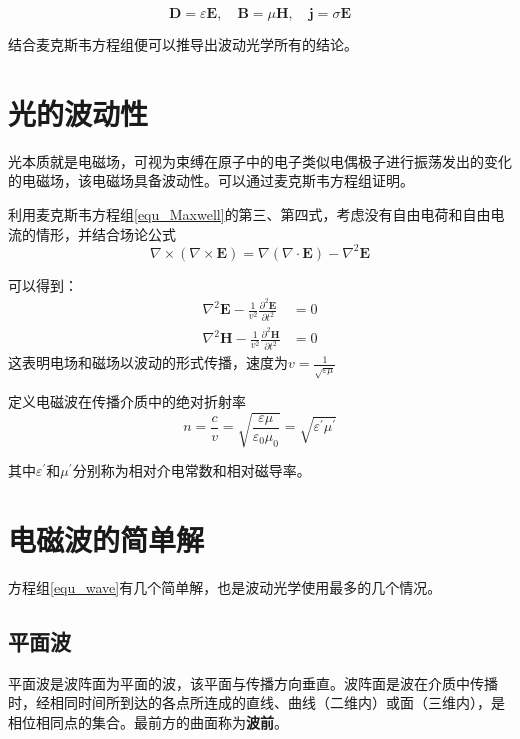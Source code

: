 \documentclass[UTF8]{ctexart}
\begin{document}
	\begin{equation}
		\boldsymbol{D}=\varepsilon \boldsymbol{E}, \quad \boldsymbol{B}=\mu \boldsymbol{H}, \quad \boldsymbol{j}=\sigma \boldsymbol{E}
	\end{equation}
	
	结合麦克斯韦方程组便可以推导出波动光学所有的结论。
	
	\section{光的波动性}
	光本质就是电磁场，可视为束缚在原子中的电子类似电偶极子进行振荡发出的变化的电磁场，该电磁场具备波动性。可以通过麦克斯韦方程组证明。
	
	利用麦克斯韦方程组\ref{equ_Maxwell}的第三、第四式，考虑没有自由电荷和自由电流的情形，并结合场论公式
	\begin{equation}
		\nabla \times(\nabla \times \boldsymbol{E})=\nabla(\nabla \cdot \boldsymbol{E})-\nabla^{2} \boldsymbol{E}
	\end{equation}
	
\noindent 可以得到：
\begin{equation}
	\begin{aligned}
	\nabla^{2} \boldsymbol{E}-\frac{1}{v^{2}}\frac{\partial^{2} \boldsymbol{E}}{\partial t^{2}}&=0
	\\
	\nabla^{2} \boldsymbol{H}-\frac{1}{v^{2}}\frac{\partial^{2} \boldsymbol{H}}{\partial t^{2}}&=0
	\end{aligned}\label{equ_wave}
\end{equation}
	这表明电场和磁场以波动的形式传播，速度为$ v=\frac{1}{\sqrt{\varepsilon \mu}} $
	
	定义电磁波在传播介质中的绝对折射率
	\begin{equation}
		n=\frac{c}{v}=\sqrt{\frac{\varepsilon \mu}{\varepsilon_{0} \mu_{0}}}=\sqrt{\varepsilon^{\prime} \mu^{\prime}}
	\end{equation}
	
\noindent 其中$ \varepsilon^{\prime} $和$ \mu^{\prime} $分别称为相对介电常数和相对磁导率。

	\section{电磁波的简单解}
	方程组\ref{equ_wave}有几个简单解，也是波动光学使用最多的几个情况。
	
	\subsection{平面波}
	平面波是波阵面为平面的波，该平面与传播方向垂直。波阵面是波在介质中传播时，经相同时间所到达的各点所连成的直线、曲线（二维内）或面（三维内），是相位相同点的集合。最前方的曲面称为\textbf{波前}。
	
\end{document}
